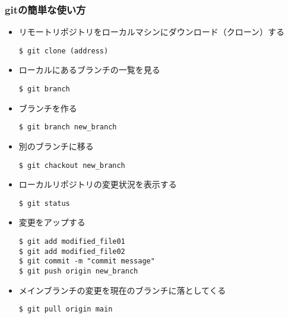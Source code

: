 \subsubsection{gitの簡単な使い方}
\begin{itemize}
    \item リモートリポジトリをローカルマシンにダウンロード（クローン）する
    \begin{lstlisting}
$ git clone (address)
    \end{lstlisting}
    \item ローカルにあるブランチの一覧を見る
    \begin{lstlisting}
$ git branch
    \end{lstlisting}
    \item ブランチを作る
    \begin{lstlisting}
$ git branch new_branch
    \end{lstlisting}
    \item 別のブランチに移る
    \begin{lstlisting}
$ git chackout new_branch
    \end{lstlisting}
    \item ローカルリポジトリの変更状況を表示する
    \begin{lstlisting}
$ git status
    \end{lstlisting}
    \item 変更をアップする
    \begin{lstlisting}
$ git add modified_file01
$ git add modified_file02
$ git commit -m "commit message"
$ git push origin new_branch
    \end{lstlisting}
    \item メインブランチの変更を現在のブランチに落としてくる
    \begin{lstlisting}
$ git pull origin main
    \end{lstlisting}
\end{itemize}

